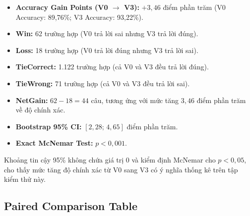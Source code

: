 \begin{itemize}
    \item \textbf{Accuracy Gain Points (V0 $\rightarrow$ V3):}
    $+3{,}46$ điểm phần trăm
    (V0 Accuracy: 89,76\%; V3 Accuracy: 93,22\%).

    \item \textbf{Win:} 62 trường hợp
    (V0 trả lời sai nhưng V3 trả lời đúng).

    \item \textbf{Loss:} 18 trường hợp
    (V0 trả lời đúng nhưng V3 trả lời sai).

    \item \textbf{TieCorrect:} 1.122 trường hợp
    (cả V0 và V3 đều trả lời đúng).

    \item \textbf{TieWrong:} 71 trường hợp
    (cả V0 và V3 đều trả lời sai).

    \item \textbf{NetGain:} $62 - 18 = 44$ câu,
    tương ứng với mức tăng $3{,}46$ điểm phần trăm về độ chính xác.

    \item \textbf{Bootstrap 95\% CI:}
    $[2{,}28;\,4{,}65]$ điểm phần trăm.

    \item \textbf{Exact McNemar Test:}
    $p < 0{,}001$.
\end{itemize}

Khoảng tin cậy 95\% không chứa giá trị 0 và kiểm định McNemar cho
$p < 0{,}05$, cho thấy mức tăng độ chính xác từ V0 sang V3 có ý
nghĩa thống kê trên tập kiểm thử này.

\subsection{Paired Comparison Table}

